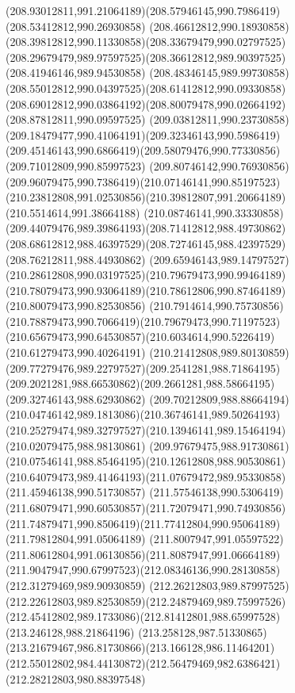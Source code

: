 {{  \curveto(208.93012811,991.21064189)(208.57946145,990.7986419)(208.53412812,990.26930858)
  \curveto(208.46612812,990.18930858)(208.39812812,990.11330858)(208.33679479,990.02797525)
  \curveto(208.29679479,989.97597525)(208.36612812,989.90397525)(208.41946146,989.94530858)
  \curveto(208.48346145,989.99730858)(208.55012812,990.04397525)(208.61412812,990.09330858)
  \curveto(208.69012812,990.03864192)(208.80079478,990.02664192)(208.87812811,990.09597525)
  \curveto(209.03812811,990.23730858)(209.18479477,990.41064191)(209.32346143,990.5986419)
  \curveto(209.45146143,990.6866419)(209.58079476,990.77330856)(209.71012809,990.85997523)
  \curveto(209.80746142,990.76930856)(209.96079475,990.7386419)(210.07146141,990.85197523)
  \curveto(210.23812808,991.02530856)(210.39812807,991.20664189)(210.5514614,991.38664188)
  \curveto(210.08746141,990.33330858)(209.44079476,989.39864193)(208.71412812,988.49730862)
  \curveto(208.68612812,988.46397529)(208.72746145,988.42397529)(208.76212811,988.44930862)
  \curveto(209.65946143,989.14797527)(210.28612808,990.03197525)(210.79679473,990.99464189)
  \curveto(210.78079473,990.93064189)(210.78612806,990.87464189)(210.80079473,990.82530856)
  \curveto(210.7914614,990.75730856)(210.78879473,990.7066419)(210.79679473,990.71197523)
  \curveto(210.65679473,990.64530857)(210.6034614,990.5226419)(210.61279473,990.40264191)
  \curveto(210.21412808,989.80130859)(209.77279476,989.22797527)(209.2541281,988.71864195)
  \curveto(209.2021281,988.66530862)(209.2661281,988.58664195)(209.32746143,988.62930862)
  \curveto(209.70212809,988.88664194)(210.04746142,989.1813086)(210.36746141,989.50264193)
  \curveto(210.25279474,989.32797527)(210.13946141,989.15464194)(210.02079475,988.98130861)
  \curveto(209.97679475,988.91730861)(210.07546141,988.85464195)(210.12612808,988.90530861)
  \curveto(210.64079473,989.41464193)(211.07679472,989.95330858)(211.45946138,990.51730857)
  \curveto(211.57546138,990.5306419)(211.68079471,990.60530857)(211.72079471,990.74930856)
  \curveto(211.74879471,990.8506419)(211.77412804,990.95064189)(211.79812804,991.05064189)
  \curveto(211.8007947,991.05597522)(211.80612804,991.06130856)(211.8087947,991.06664189)
  \curveto(211.9047947,990.67997523)(212.08346136,990.28130858)(212.31279469,989.90930859)
  \curveto(212.26212803,989.87997525)(212.22612803,989.82530859)(212.24879469,989.75997526)
  \curveto(212.45412802,989.1733086)(212.81412801,988.65997528)(213.246128,988.21864196)
  \curveto(213.258128,987.51330865)(213.21679467,986.81730866)(213.166128,986.11464201)
  \curveto(212.55012802,984.44130872)(212.56479469,982.6386421)(212.28212803,980.88397548)
}}

